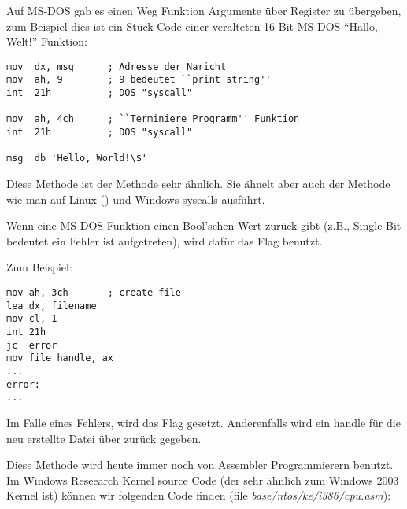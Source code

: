 
Auf MS-DOS gab es einen Weg Funktion Argumente über Register zu übergeben, zum Beispiel dies 
ist ein Stück Code einer veralteten 16-Bit MS-DOS ``Hallo, Welt!'' Funktion:

\begin{lstlisting}[style=customasmx86]
mov  dx, msg      ; Adresse der Naricht
mov  ah, 9        ; 9 bedeutet ``print string''
int  21h          ; DOS "syscall"

mov  ah, 4ch      ; ``Terminiere Programm'' Funktion
int  21h          ; DOS "syscall"

msg  db 'Hello, World!\$' 
\end{lstlisting}

Diese Methode ist der  Methode sehr ähnlich. Sie ähnelt aber auch der Methode
wie man auf Linux () und Windows syscalls ausführt.

Wenn eine MS-DOS Funktion einen Bool'schen Wert zurück gibt (z.B., Single Bit bedeutet ein Fehler ist aufgetreten), wird dafür das  Flag benutzt.

Zum Beispiel:

\begin{lstlisting}[style=customasmx86]
mov ah, 3ch       ; create file
lea dx, filename
mov cl, 1
int 21h
jc  error
mov file_handle, ax
...
error:
...
\end{lstlisting}

Im Falle eines Fehlers, wird das  Flag gesetzt. Anderenfalls wird ein handle für die neu erstellte Datei über  zurück gegeben. 


Diese Methode wird heute immer noch von Assembler Programmierern benutzt.
Im Windows Reseearch Kernel source Code (der sehr ähnlich zum Windows 2003 Kernel ist) können wir folgenden Code
finden (file \emph{base/ntos/ke/i386/cpu.asm}):

